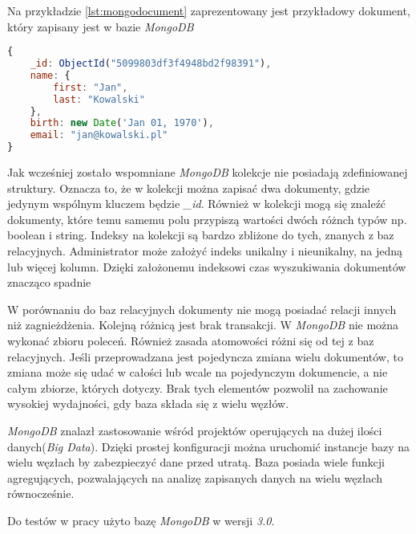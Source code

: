 Na przykładzie \ref{lst:mongodocument} zaprezentowany jest przykładowy dokument, który zapisany jest w bazie \textsl{MongoDB}

\begin{lstlisting}[language=JavaScript,caption=Przykład dokumentu zapisanego w bazie MongoDB,label={lst:mongodocument}]
{
    _id: ObjectId("5099803df3f4948bd2f98391"),
    name: { 
        first: "Jan", 
        last: "Kowalski" 
    },
    birth: new Date('Jan 01, 1970'),
    email: "jan@kowalski.pl"
}
\end{lstlisting}

Jak wcześniej zostało wspomniane \textsl{MongoDB} kolekcje nie posiadają zdefiniowanej struktury. Oznacza to, że w kolekcji można zapisać dwa dokumenty, gdzie jedynym wspólnym kluczem będzie \textsl{\_id}. Również w kolekcji mogą się znaleźć dokumenty, które temu samemu polu przypiszą wartości dwóch różnch typów np. boolean i string. Indeksy na kolekcji są bardzo zbliżone do tych, znanych z baz relacyjnych. Administrator może założyć indeks unikalny i nieunikalny, na jedną lub więcej kolumn. Dzięki założonemu indeksowi czas wyszukiwania dokumentów znacząco spadnie

W porównaniu do baz relacyjnych dokumenty nie mogą posiadać relacji innych niż zagnieżdżenia. Kolejną różnicą jest brak transakcji. W \textsl{MongoDB} nie można wykonać zbioru poleceń. Również zasada atomowości różni się od tej z baz relacyjnych. Jeśli przeprowadzana jest pojedyncza zmiana wielu dokumentów, to zmiana może się udać w całości lub wcale na pojedynczym dokumencie, a nie całym zbiorze, których dotyczy. Brak tych elementów pozwolił na zachowanie wysokiej wydajności, gdy baza składa się z wielu węzłów.

\textsl{MongoDB} znalazł zastosowanie wśród projektów operujących na dużej ilości danych(\textsl{Big Data}). Dzięki prostej konfiguracji można uruchomić instancje bazy na wielu węzłach by zabezpieczyć dane przed utratą. Baza posiada wiele funkcji agregujących, pozwalających na analizę zapisanych danych na wielu węzłach równocześnie. 

Do testów w pracy użyto bazę \textsl{MongoDB} w wersji \textsl{3.0}.


